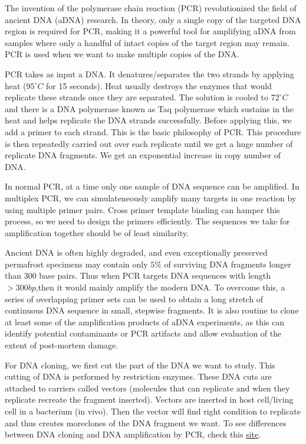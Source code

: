 \documentclass[]{article}
\begin{document}
The invention of the polymerase chain reaction (PCR) revolutionized the
field of ancient DNA (aDNA) research. In theory, only a single copy of
the targeted DNA region is required for PCR, making it a powerful tool
for amplifying aDNA from samples where only a handful of intact copies
of the target region may remain. PCR is used when we want to make
multiple copies of the DNA.

PCR takes as input a DNA. It denatures/separates the two strands by
applying heat (\(95^{\circ} C\) for 15 seconds). Heat usually destroys
the enzymes that would replicate these strands once they are separated.
The solution is cooled to \(72^{\circ} C\) and there is a DNA polymerase
known as Taq polymerase which sustains in the heat and helps replicate
the DNA strands successfully. Before applying this, we add a primer to
each strand. This is the basic philosophy of PCR. This procedure is then
repeatedly carried out over each replicate until we get a huge number of
replicate DNA fragments. We get an exponential increase in copy number
of DNA.

In normal PCR, at a time only one sample of DNA sequence can be
amplified. In multiplex PCR, we can simulateneously amplify many targets
in one reaction by using multiple primer pairs. Cross primer template
binding can hamper this process, so we need to design the primers
efficiently. The sequences we take for amplification together should be
of least similarity.

Ancient DNA is often highly degraded, and even exceptionally preserved
permafrost specimens may contain only \(5\%\) of surviving DNA fragments
longer than 300 base pairs. Thus when PCR targets DNA sequences with
length \(> 300bp\),then it would mainly amplify the modern DNA. To
overcome this, a series of overlapping primer sets can be used to obtain
a long stretch of continuous DNA sequence in small, stepwise fragments.
It is also routine to clone at least some of the amplification products
of aDNA experiments, as this can identify potential contaminants or PCR
artifacts and allow evaluation of the extent of post-mortem damage.

For DNA cloning, we first cut the part of the DNA we want to study. This
cutting of DNA is performed by restriction enzymes. These DNA cuts are
attached to carriers called vectors (molecules that can replicate and
when they replicate recreate the fragment inserted). Vectors are
inserted in host cell/living cell in a bacterium (in vivo). Then the
vector will find right condition to replicate and thus creates
moreclones of the DNA fragment we want. To see differences between DNA
cloning and DNA amplification by PCR, check this
\href{http://www.majordifferences.com/2013/10/difference-between-gene-cloning-and-pcr.html\#.VqmE4ZMrL-Y}{site}.
\end{document}
